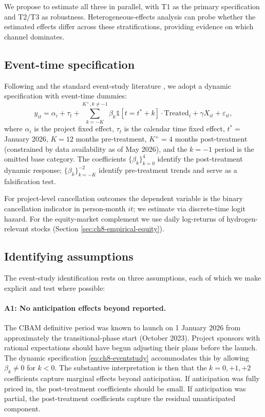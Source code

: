 \documentclass[11pt,a4paper]{article}
\begin{document}
We propose to estimate all three in parallel, with T1 as the primary specification and T2/T3 as robustness. Heterogeneous-effects analysis can probe whether the estimated effects differ across these stratifications, providing evidence on which channel dominates.

\subsection{Event-time specification}

Following \citet{hanemaaijer2024minority} and the standard event-study literature \citep{bindler2022scaring}, we adopt a dynamic specification with event-time dummies:
\begin{equation}
y_{it} = \alpha_i + \tau_t + \sum_{k = -K}^{K^{+}, k \neq -1} \beta_k \mathbb{1}[t = t^* + k] \cdot \mathrm{Treated}_i + \gamma X_{it} + \varepsilon_{it},
\label{eq:ch8-eventstudy}
\end{equation}
where $\alpha_i$ is the project fixed effect, $\tau_t$ is the calendar time fixed effect, $t^* = $ January 2026, $K = 12$ months pre-treatment, $K^{+} = 4$ months post-treatment (constrained by data availability as of May 2026), and the $k = -1$ period is the omitted base category. The coefficients $\{\beta_k\}_{k=0}^{4}$ identify the post-treatment dynamic response; $\{\beta_k\}_{k=-K}^{-2}$ identify pre-treatment trends and serve as a falsification test.

For project-level cancellation outcomes the dependent variable is the binary cancellation indicator in person-month $it$; we estimate via discrete-time logit hazard. For the equity-market complement we use daily log-returns of hydrogen-relevant stocks (Section \ref{sec:ch8-empirical-equity}).

\subsection{Identifying assumptions}

The event-study identification rests on three assumptions, each of which we make explicit and test where possible:

\paragraph{A1: No anticipation effects beyond reported.} The CBAM definitive period was known to launch on 1 January 2026 from approximately the transitional-phase start (October 2023). Project sponsors with rational expectations should have begun adjusting their plans before the launch. The dynamic specification \eqref{eq:ch8-eventstudy} accommodates this by allowing $\beta_k \neq 0$ for $k < 0$. The substantive interpretation is then that the $k = 0, +1, +2$ coefficients capture marginal effects beyond anticipation. If anticipation was fully priced in, the post-treatment coefficients should be small. If anticipation was partial, the post-treatment coefficients capture the residual unanticipated component.
\end{document}
